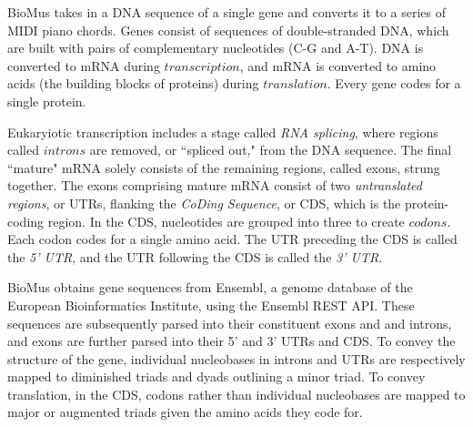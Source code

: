 \documentclass[letterpaper]{article}
\begin{document}
BioMus takes in a DNA sequence of a single gene and converts it to a series of MIDI piano chords. Genes consist of sequences of double-stranded DNA, 
which are built with pairs of complementary nucleotides (C-G and A-T). 
DNA is converted to mRNA during $transcription$, and mRNA is converted to amino acids (the building blocks of proteins) during $translation$. Every gene codes for a single protein. 

Eukaryiotic transcription includes a stage called \textit{RNA splicing}, where regions called $introns$ are removed, or ``spliced out," from the DNA sequence. The final ``mature" mRNA solely consists of the remaining regions, called exons, strung together. The exons comprising mature mRNA consist of two \textit{untranslated regions}, or UTRs, flanking the \textit{CoDing Sequence}, or CDS, which is the protein-coding region. 
In the CDS, nucleotides are grouped into three to create $codons$. Each codon codes for a single amino acid. The UTR preceding the CDS is called the \textit{5' UTR}, and the UTR following the CDS is called the \textit{3' UTR}.

BioMus obtains gene sequences from Ensembl, a genome database of the European Bioinformatics Institute, using the Ensembl REST API. These sequences are subsequently parsed into their constituent exons and and introns, and exons are further parsed into their 5' and 3' UTRs and CDS. To convey the structure of the gene, individual nucleobases in introns and UTRs are respectively mapped to diminished triads and dyads outlining a minor triad. To convey translation, in the CDS, codons rather than individual nucleobases are mapped to major or augmented triads given the amino acids they code for. 
\end{document}
